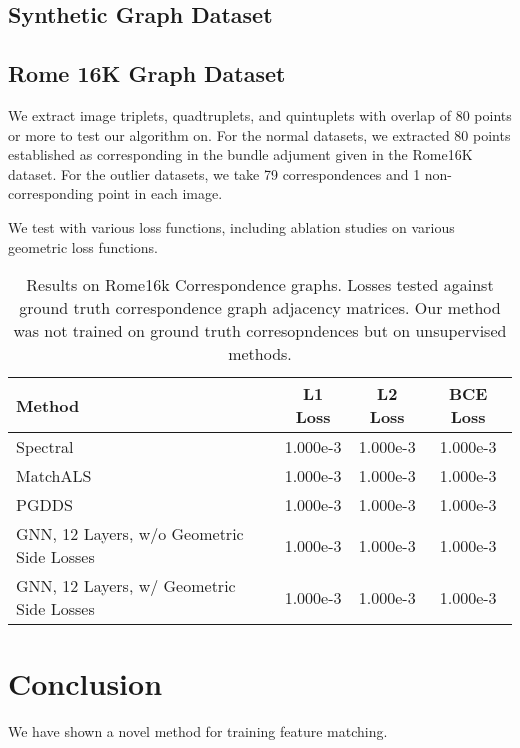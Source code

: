 \documentclass[10pt,twocolumn,letterpaper]{article}
\begin{document}
\subsection{Synthetic Graph Dataset}


\subsection{Rome 16K Graph Dataset}
We extract image triplets, quadtruplets, and quintuplets with overlap of 80 points or more to test our algorithm on. For the normal datasets, we extracted 80 points established as corresponding in the bundle adjument given in the Rome16K dataset. For the outlier datasets, we take 79 correspondences and 1 non-corresponding point in each image.

We test with various loss functions, including ablation studies on various geometric loss functions.

\begin{table*}
\begin{center}
\begin{tabular}{|l|c|c|c|}
\hline
Method & L1 Loss & L2 Loss & BCE Loss \\
\hline\hline\hline
Spectral                                  & 1.000e-3 & 1.000e-3 & 1.000e-3 \\ \hline
MatchALS                                  & 1.000e-3 & 1.000e-3 & 1.000e-3 \\ \hline
PGDDS                                     & 1.000e-3 & 1.000e-3 & 1.000e-3 \\ \hline
GNN, 12 Layers, w/o Geometric Side Losses & 1.000e-3 & 1.000e-3 & 1.000e-3 \\ \hline
GNN, 12 Layers, w/ Geometric Side Losses  & 1.000e-3 & 1.000e-3 & 1.000e-3 \\ \hline

\hline
\end{tabular}
\end{center}
\caption{
Results on Rome16k Correspondence graphs.
Losses tested against ground truth correspondence graph adjacency matrices.
Our method was not trained on ground truth corresopndences but on unsupervised methods.
}
\end{table*}


\section{Conclusion}

We have shown a novel method for training feature matching. 

{\small


}
\end{document}
